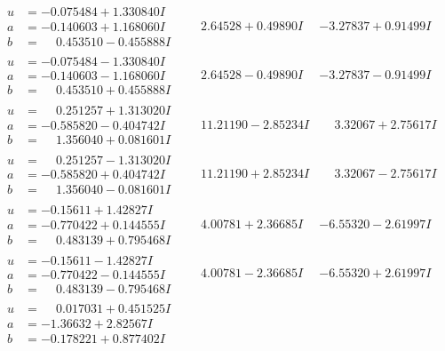 \documentclass[1p]{elsarticle_modified}
\theoremstyle{definition}
\begin{document}
$$\begin{array}{c|c|c}
\begin{aligned}
u &= -0.075484 + 1.330840 I \\
a &= -0.140603 + 1.168060 I \\
b &= \phantom{-}0.453510 - 0.455888 I\end{aligned}
 & \phantom{-}2.64528 + 0.49890 I & -3.27837 + 0.91499 I \\ \hline\begin{aligned}
u &= -0.075484 - 1.330840 I \\
a &= -0.140603 - 1.168060 I \\
b &= \phantom{-}0.453510 + 0.455888 I\end{aligned}
 & \phantom{-}2.64528 - 0.49890 I & -3.27837 - 0.91499 I \\ \hline\begin{aligned}
u &= \phantom{-}0.251257 + 1.313020 I \\
a &= -0.585820 - 0.404742 I \\
b &= \phantom{-}1.356040 + 0.081601 I\end{aligned}
 & \phantom{-}11.21190 - 2.85234 I & \phantom{-}3.32067 + 2.75617 I \\ \hline\begin{aligned}
u &= \phantom{-}0.251257 - 1.313020 I \\
a &= -0.585820 + 0.404742 I \\
b &= \phantom{-}1.356040 - 0.081601 I\end{aligned}
 & \phantom{-}11.21190 + 2.85234 I & \phantom{-}3.32067 - 2.75617 I \\ \hline\begin{aligned}
u &= -0.15611 + 1.42827 I \\
a &= -0.770422 + 0.144555 I \\
b &= \phantom{-}0.483139 + 0.795468 I\end{aligned}
 & \phantom{-}4.00781 + 2.36685 I & -6.55320 - 2.61997 I \\ \hline\begin{aligned}
u &= -0.15611 - 1.42827 I \\
a &= -0.770422 - 0.144555 I \\
b &= \phantom{-}0.483139 - 0.795468 I\end{aligned}
 & \phantom{-}4.00781 - 2.36685 I & -6.55320 + 2.61997 I \\ \hline\begin{aligned}
u &= \phantom{-}0.017031 + 0.451525 I \\
a &= -1.36632 + 2.82567 I \\
b &= -0.178221 + 0.877402 I\end{aligned}

\end{array}$$
\end{document}
